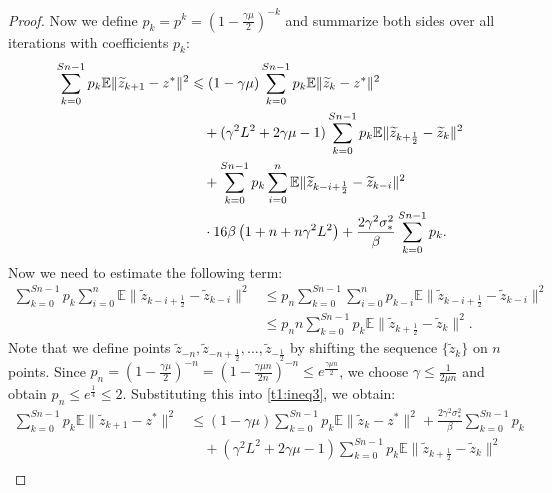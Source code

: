 \documentclass{article}
\begin{document}
\begin{proof}
        Now we define $p_k = p^k = \left(1 - \frac{\gamma\mu}{2}\right)^{-k}$ and summarize both sides over all iterations with coefficients $p_k$:
        \begin{align}
        \notag
        \sum\limits_{k = 0}^{Sn-1} p_k\mathbb{E} \|\widetilde{z}_{k+1} - z^*\|^2 & \leqslant (1 - \gamma\mu)\sum\limits_{k = 0}^{Sn-1} p_k\mathbb{E} \|\widetilde{z}_k - z^*\|^2 \\
        \notag
        & \quad + (\gamma^2 L^2 + 2\gamma\mu - 1)\sum\limits_{k = 0}^{Sn-1} p_k\mathbb{E} \|\widetilde{z}_{k+\frac{1}{2}} - \widetilde{z}_k\|^2 \\
        \notag
        & \quad + \sum\limits_{k = 0}^{Sn-1} p_k\sum\limits_{i = 0}^n \mathbb{E} \|\widetilde{z}_{k - i + \frac{1}{2}} - \widetilde{z}_{k-i}\|^2\\
        \label{t1:ineq3}
        & \quad \cdot 16\beta\left(1 + n + n\gamma^2 L^2\right) + \frac{2\gamma^2\sigma_*^2}{\beta}\sum\limits_{k = 0}^{Sn-1}p_k.
        \end{align}
        Now we need to estimate the following term:
        \begin{align*}
            \sum\limits_{k = 0}^{Sn-1} p_k\sum\limits_{i = 0}^n \mathbb{E} \|\widetilde{z}_{k - i + \frac{1}{2}} - \widetilde{z}_{k-i}\|^2 &\leqslant p_n \sum\limits_{k = 0}^{Sn-1} \sum\limits_{i = 0}^n p_{k-i}\mathbb{E} \|\widetilde{z}_{k - i + \frac{1}{2}} - \widetilde{z}_{k-i}\|^2 \\
            &\leqslant p_n n \sum\limits_{k = 0}^{Sn-1} p_k\mathbb{E} \|\widetilde{z}_{k + \frac{1}{2}} - \widetilde{z}_k\|^2.
        \end{align*}
        Note that we define points $\widetilde{z}_{-n}, \widetilde{z}_{-n+\frac{1}{2}}, \ldots, \widetilde{z}_{-\frac{1}{2}}$ by shifting the sequence $\{\widetilde{z}_k\}$ on $n$ points. Since $p_n = \left(1 - \frac{\gamma\mu}{2}\right)^{-n} = \left(1 - \frac{\gamma\mu n}{2n}\right)^{-n} \leqslant e^{\frac{\gamma\mu n}{2}}$, we choose $\gamma \leqslant \frac{1}{2\mu n}$ and obtain $p_n \leqslant e^{\frac{1}{4}} \leqslant 2$. Substituting this into \eqref{t1:ineq3}, we obtain:
        \begin{align*}
            \sum\limits_{k = 0}^{Sn-1} p_k\mathbb{E} \|\widetilde{z}_{k+1} - z^*\|^2 & \leqslant (1 - \gamma\mu)\sum\limits_{k = 0}^{Sn-1} p_k\mathbb{E} \|\widetilde{z}_k - z^*\|^2 + \frac{2\gamma^2\sigma_*^2}{\beta}\sum\limits_{k = 0}^{Sn-1}p_k \\
            & \quad + (\gamma^2 L^2 + 2\gamma\mu - 1)\sum\limits_{k = 0}^{Sn-1} p_k\mathbb{E} \|\widetilde{z}_{k+\frac{1}{2}} - \widetilde{z}_k\|^2 \\

\end{align*}
\end{proof}
\end{document}
